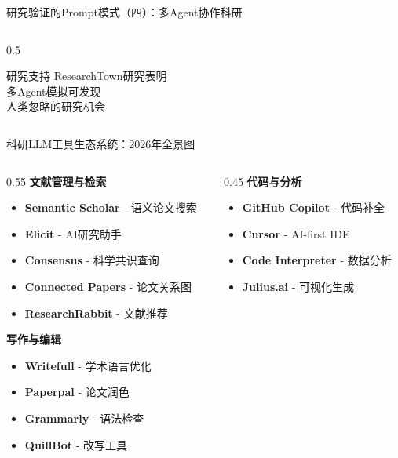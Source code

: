 \documentclass[aspectratio=169,11pt]{beamer}
\begin{document}
\begin{frame}[fragile]{研究验证的Prompt模式（四）：多Agent协作科研}
\begin{columns}
\begin{column}{0.5\textwidth}
            \vspace{0.2cm}
            \begin{block}{研究支持}
                \small
                ResearchTown研究表明\\
                多Agent模拟可发现\\
                人类忽略的研究机会
            \end{block}
        \end{column}
    \end{columns}
\end{frame}

\begin{frame}{科研LLM工具生态系统：2026年全景图}
    \begin{columns}
        \begin{column}{0.55\textwidth}
            \textbf{文献管理与检索}
            \begin{itemize}
                \item \textbf{Semantic Scholar} - 语义论文搜索
                \item \textbf{Elicit} - AI研究助手
                \item \textbf{Consensus} - 科学共识查询
                \item \textbf{Connected Papers} - 论文关系图
                \item \textbf{ResearchRabbit} - 文献推荐
            \end{itemize}
            
            \vspace{0.3cm}
            \textbf{写作与编辑}
            \begin{itemize}
                \item \textbf{Writefull} - 学术语言优化
                \item \textbf{Paperpal} - 论文润色
                \item \textbf{Grammarly} - 语法检查
                \item \textbf{QuillBot} - 改写工具
            \end{itemize}
        \end{column}
        \begin{column}{0.45\textwidth}
            \textbf{代码与分析}
            \begin{itemize}
                \item \textbf{GitHub Copilot} - 代码补全
                \item \textbf{Cursor} - AI-first IDE
                \item \textbf{Code Interpreter} - 数据分析
                \item \textbf{Julius.ai} - 可视化生成
            \end{itemize}
            

\end{column}
\end{columns}
\end{frame}
\end{document}
